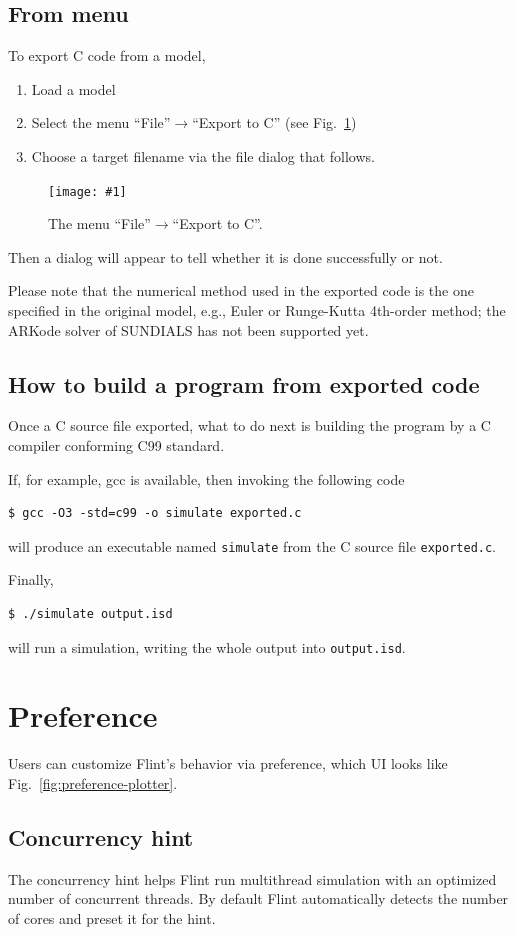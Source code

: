 \documentclass[a4paper,10pt]{report}
\newcommand\FigureOfImage[2]{\begin{figure}[h]
  \centering
  \texttt{[image: \#1]}
  \caption{#2}\label{fig:#1}
\end{figure}}
\begin{document}
\subsection{From menu}
To export C code from a model,
\begin{enumerate}
\item Load a model
\item Select the menu ``File''$\rightarrow$``Export to C'' (see Fig.~\ref{fig:export-to-c})
\item Choose a target filename via the file dialog that follows.
\end{enumerate}
\FigureOfImage{export-to-c}{The menu ``File''$\rightarrow$``Export to C''.}
Then a dialog will appear to tell whether it is done successfully or not.

Please note that the numerical method used in the exported code is the one
specified in the original model, e.g., Euler or Runge-Kutta 4th-order method;
the ARKode solver of SUNDIALS has not been supported yet.

\subsection{How to build a program from exported code}
Once a C source file exported, what to do next is building the program by a C compiler
conforming C99 standard.

If, for example, gcc is available, then invoking the following code
\begin{verbatim}
$ gcc -O3 -std=c99 -o simulate exported.c
\end{verbatim}
will produce an executable named {\tt simulate} from the C source file {\tt exported.c}.

Finally,
\begin{verbatim}
$ ./simulate output.isd
\end{verbatim}
will run a simulation, writing the whole output into {\tt output.isd}.

\section{Preference}
\label{sec:preference}
Users can customize Flint's behavior via preference, which UI looks like
Fig.~\ref{fig:preference-plotter}.

\subsection{Concurrency hint}
The concurrency hint helps Flint run multithread simulation with an optimized number
of concurrent threads. By default Flint automatically detects the number of cores and
preset it for the hint.
\end{document}
